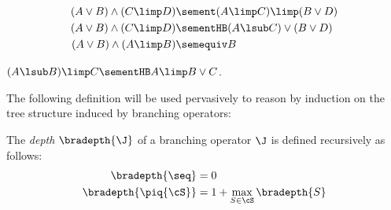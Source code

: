 \begin{fact}
  \begin{align*}
  (A \lor B) \land (C \limp D) &\sement (A \limp C) \limp (B \lor D) \\
  (A \lor B) \land (C \limp D) &\sementHB (A \lsub C) \lor (B \lor D) \\
  (A \lor B) \land (A \limp B) &\semequiv B
  \end{align*}
\end{fact}

\begin{fact}
  $(A \lsub B) \limp C \sementHB A \limp B \lor C$.
\end{fact}

The following definition will be used pervasively to reason by induction on the
tree structure induced by branching operators:

\begin{definition}
  The \emph{depth} $\bradepth{\J}$ of a branching operator $\J$ is defined
  recursively as follows:
  \begin{align*}
    \bradepth{\seq} &= 0 \\
    \bradepth{\piq{\cS}} &= 1 + \max_{S \in \cS}{\bradepth{S}}
  \end{align*}
\end{definition}


